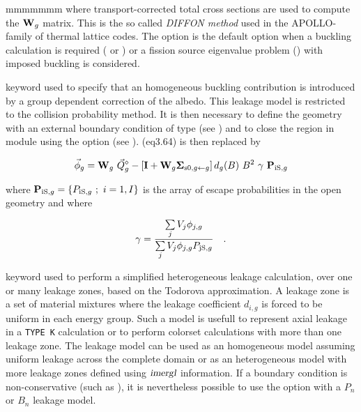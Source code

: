 \begin{ListeDeDescription}{mmmmmmm}
\noindent where transport-corrected total
cross sections are used to compute the ${\bf W}_g$ matrix. This is the so called
{\sl DIFFON method} used in the APOLLO-family of thermal lattice codes. The  option is
the default option when a buckling calculation is required ( or ) or a
fission source eigenvalue problem () with imposed buckling is considered.

\item[\moc{ALBS}] keyword used to specify that an homogeneous buckling
contribution is introduced by a group dependent correction of the
albedo.\cite{ALSB2} This leakage model is restricted to the collision probability
method. It is then necessary to define the geometry with an
external boundary condition of type  (see ) and to close
the region in module  using the  option (see
). \eq(eq3.64) is then replaced by

\begin{equation}
\vec\phi_g={\bf W}_g \ \vec Q^\diamond_g-\left[ {\bf I}+{\bf W}_g{\bf \Sigma}_{{\rm s0},g\gets g}\right] d_g(B) \ B^2 
\ \gamma \ {\bf P}_{{\rm iS},g}
\label{eq:eq5.34}
\end{equation}

\noindent where ${\bf P}_{{\rm iS},g}=\{P_{{\rm iS},g} \ ; \ i=1,I \}$ is the array of escape
probabilities in the open geometry and where

\begin{equation}
\gamma={\sum\limits_j V_j \phi_{j,g} \over \sum\limits_j V_j \phi_{j,g} P_{{\rm jS},g}} \ \ \ .
\label{eq:eq5.35}
\end{equation}

\item[\moc{HETE}] keyword used to perform a simplified heterogeneous leakage calculation, over one or many leakage zones, based
on the Todorova approximation.\cite{todorova} A leakage zone is a set of material mixtures where the leakage coefficient $d_{i,g}$ is
forced to be uniform in each energy group. Such a model is usefull to represent axial leakage in a {\tt TYPE~K} calculation or to
perform colorset calculations with more than one leakage zone. The  leakage model can be used as an homogeneous model
assuming uniform leakage across the complete domain or as an heterogeneous model with more leakage zones defined using $\dusa{imergl}$
information. If a boundary condition is non-conservative (such as ), it is nevertheless possible to use the  option
with a $P_n$ or $B_n$ leakage model.


\end{ListeDeDescription}
